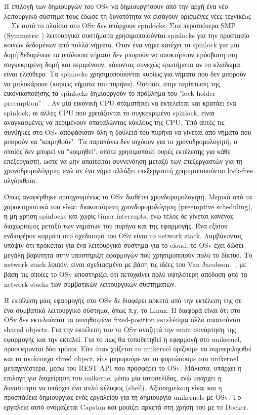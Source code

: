 Η επιλογή των δημιουργών του OSv να δημιουργήσουν από την αρχή ένα νέο
λειτουργικό σύστημα τους έδωσε τη δυνατότητα να εισάγουν ορισμένες νέες
τεχνικέaς ~\cite{kivity2014v}. Σε αυτό το πλαίσιο στο OSv δεν υπάρχουν
spinlocks. Στα περισσότερα SMP (Symmetric )
λειτουργικά συστήματα χρησιμοποιούνται spinlocks για την προστασία κοινών
δεδομένων από πολλά νήματα. Όταν ένα νήμα κατέχει το spinlock για μία δομή
δεδομένων τα υπόλοιπα νήματα δεν μπορούν να αποκτήσουν πρόσβαση στη συγκεκριμένη
δομή και περιμένουν, κάνοντας συνεχώς ερωτήματα αν το κλείδωμα είναι ελεύθερο.
Τα spinlocks χρησιμοποιούνται κυρίως για νήματα που δεν μπορούν να μπλοκάρουν
(κυρίως νήματα του πυρήνα). Ωστόσο, στην περίπτωση της εικονικοποίησης τα
spinlocks δημιουργούν το πρόβλημα του "lock-holder preemption”
~\cite{uhlig2004towards}. Αν μία εικονική CPU σταματήσει να εκτελείται και
κρατάει ένα spinlock, οι άλλες CPU που χρειάζονται το συγκεκριμένο spinlock,
είναι αναγκασμένες να περιμένουν σπαταλώντας κύκλους της CPU. Υπό αυτές τις
συνθήκες στο OSv αποφάσισαν όλη η δουλειά του πυρήνα να γίνεται από νήματα που
μπορούν να "κοιμηθούν". Τα παραπάνω δεν ισχύουν για το χρονοδρομολογητή, ο
οποίος δεν μπορεί να "κοιμηθεί", οπότε χρησιμοποιεί ουρές εκτέλεσης για κάθε
επεξεργαστή, ωστε να μην απαιτείται συννενόηση μεταξύ των επεξεργαστών για τη
χρονοδρομολόγηση, ενώ αν ένα νήμα αλλάξει επεξεργαστή χρησιμοποιούνται lock-free
αλγόριθμοι.

Όπως αναφέρθηκε προηγουμένως το OSv διαθέτει χρονδορομολογητή. Μερικά από τα
χαρακτηριστικά του είναι: διακοπτόμενη χρονδορομολόγηση (preemptive scheduling),
η μη χρήση spinlocks και χωρίς timer interrupts, ενώ τέλος δε γίνεται κανένας
διαχωρισμός μεταξύ των νημάτων του πυρήνα και της εφαρμογής. Ένα εξίσου
ενδιαφέρον κομμάτι στο σχεδιασμό του OSv είναι το network stack. Λαμβάνοντας
υπόψιν ότι πρόκειται για ένα λειτουργικό συστημα για το cloud, το OSv έχει δώσει
μεγάλη βαρύτητα στην υποστήριξη εφαρμογών που χρησιμοποιούν πολύ το δίκτυο. Το
network stack λοιπόν, είναι σχεδιασμένο με βάση τις ιδέες του Van Jacobson
~\cite{jacobson2006speeding}, με βάση τις οποίες το OSv υποστηρίζει ότι
πετυχαίνει πολύ υψηλότερη απόδοση από τα network stacks των συμβατικών
λειτουργικών συστημάτων. 

H εκτέλεση μίας εφαρμογής στο OSv δε διαφέρει αρκετά από την εκτέλεση της σε ένα
συμβατικό λειτουργικό σύστημα, όπως π.χ. το Linux. Η διαφορά είναι ότι στο OSv
δεν εκτελούνται τα συνηθισμένα fixed-position εκτελέσιμα αλλά απαιτούνται shared
objects. Για την εκτέλεση του το OSv αναζητά την main συνάρτηση της εφαρμογής
και την εκτελεί. Για το πως θα τοποθετηθεί η εφαρμογή στο unikernel,
προσφέρονται δύο τρόποι. Εϊτε όταν χτίζεται το unikernel ορίζουμε να
συμπεριληφθεί και το αντίστοιχο shred object, είτε μπρορούμε να το φορτώσουμε
στο unikernel μεταγενέστερα, μέσω του REST API που προσφέρει το OSv. Μάλιστα,
υπάρχει η επιλογή για διαχείρηση του unikernel μέσω μία ιστοσελίδας, ενώ υπάρχει
η δυνατότητα να υπάρχει ένα απλό κέλυφος (shell). Αξιοσημείωτη είναι και η
προσπάθεια δημιουργίας ενός εργαλείου για τη δημιουργία unikernels με OSv. Το
εργαλείο αυτό ονομάζεται Capstan και μοιάζει αρκετά στη χρήση του με το Docker.

